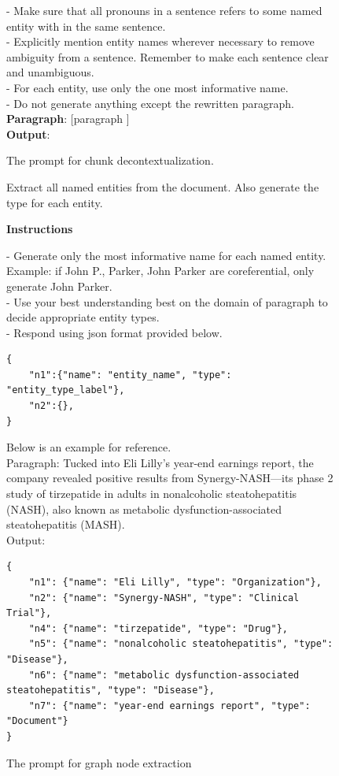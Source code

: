 \documentclass{article} %
\begin{document}
\begin{figure}[!ht]
\begin{mdframed}
- Make sure that all pronouns in a sentence refers to some named entity with in the same sentence. \\
- Explicitly mention entity names wherever necessary to remove ambiguity from a sentence. Remember to make each sentence clear and unambiguous. \\
- For each entity, use only the one most informative name.\\
- Do not generate anything except the rewritten paragraph. \\
\textbf{Paragraph}: [paragraph ]\\
\textbf{Output}:\\
\end{mdframed}
\caption{The prompt for chunk decontextualization.} \label{prompt:decontextualizatio}
\end{figure}


\begin{figure}[!ht]
\tiny
\begin{mdframed}
Extract all named entities from the document. Also generate the type for each entity.

\textbf{Instructions}

- Generate only the most informative name for each named entity. Example: if John P., Parker, John Parker are coreferential, only generate John Parker.\\
- Use your best understanding best on the domain of paragraph to decide appropriate entity types.\\
- Respond using json format provided below.

\begin{verbatim}
{
    "n1":{"name": "entity_name", "type": "entity_type_label"},
    "n2":{},
}
\end{verbatim}

Below is an example for reference.\\
Paragraph: Tucked into Eli Lilly’s year-end earnings report, the company revealed positive results from Synergy-NASH—its phase 2 study of tirzepatide in adults in nonalcoholic steatohepatitis (NASH), also known as metabolic dysfunction-associated steatohepatitis (MASH).\\
Output:

\begin{verbatim}
{
    "n1": {"name": "Eli Lilly", "type": "Organization"},
    "n2": {"name": "Synergy-NASH", "type": "Clinical Trial"},
    "n4": {"name": "tirzepatide", "type": "Drug"},
    "n5": {"name": "nonalcoholic steatohepatitis", "type": "Disease"},
    "n6": {"name": "metabolic dysfunction-associated steatohepatitis", "type": "Disease"},
    "n7": {"name": "year-end earnings report", "type": "Document"}
}
\end{verbatim}
\end{mdframed}
\caption{The prompt for graph node extraction} \label{prompt:entity}
\end{figure}
\end{document}
